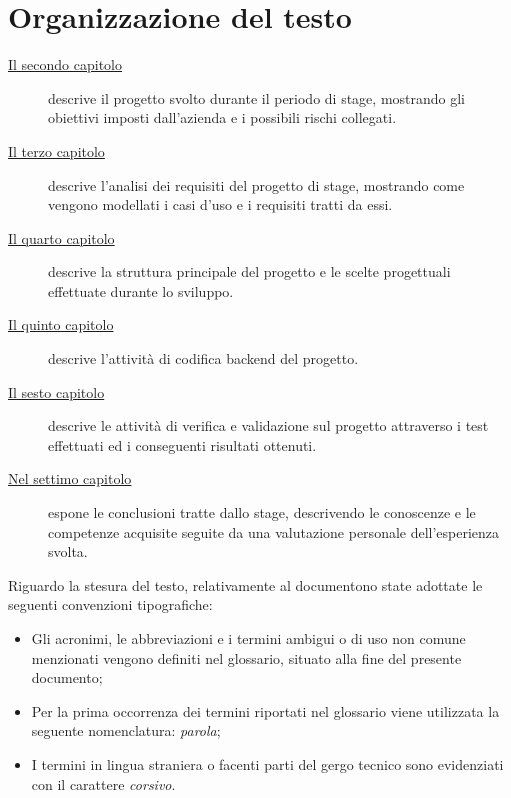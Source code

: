 \section{Organizzazione del testo}

\begin{description}
    \item[{\hyperref[cap:descrizione-stage]{Il secondo capitolo}}] descrive
          il progetto svolto durante il periodo di stage, mostrando gli
          obiettivi imposti dall'azienda e i possibili rischi collegati.

    \item[{\hyperref[cap:analisi-requisiti]{Il terzo capitolo}}] descrive
          l'analisi dei requisiti del progetto di stage, mostrando come vengono
          modellati i casi d'uso e i requisiti tratti da essi.

    \item[{\hyperref[cap:struttura-progettazione]{Il quarto capitolo}}] descrive
          la struttura principale del progetto e le scelte progettuali effettuate
          durante lo sviluppo.

    \item[{\hyperref[cap:codifica]{Il quinto capitolo}}] descrive l'attività di
          codifica backend del progetto.

    \item[{\hyperref[cap:verifica-validazione]{Il sesto capitolo}}] descrive le
          attività di verifica e validazione sul progetto attraverso i test effettuati
          ed i conseguenti risultati ottenuti.

    \item[{\hyperref[cap:conclusioni]{Nel settimo capitolo}}] espone le
          conclusioni tratte dallo stage, descrivendo le conoscenze e le competenze
          acquisite seguite da una valutazione personale dell'esperienza svolta.
\end{description}

Riguardo la stesura del testo, relativamente al documentono state adottate le seguenti convenzioni tipografiche:
\begin{itemize}
    \item Gli acronimi, le abbreviazioni e i termini ambigui o di uso non comune menzionati vengono definiti nel glossario, situato alla fine del presente documento;
    \item Per la prima occorrenza dei termini riportati nel glossario viene utilizzata la seguente nomenclatura: \glsfirstoccur\emph{parola};
    \item I termini in lingua straniera o facenti parti del gergo tecnico sono evidenziati con il carattere \emph{corsivo}.
\end{itemize}
